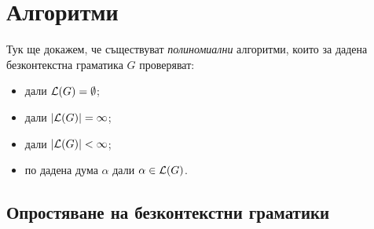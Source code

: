 \section{Алгоритми}

Тук ще докажем, че съществуват {\em полиномиални} алгоритми, които за дадена безконтекстна граматика $G$ проверяват:
\begin{itemize}
\item
  дали $\mathcal{L}(G) = \emptyset$;
\item
  дали $|\mathcal{L}(G)| = \infty$;
\item
  дали $|\mathcal{L}(G)| < \infty$;
\item
  по дадена дума $\alpha$ дали $\alpha \in \mathcal{L}(G)$.
\end{itemize}

\subsection{Опростяване на безконтекстни граматики}













